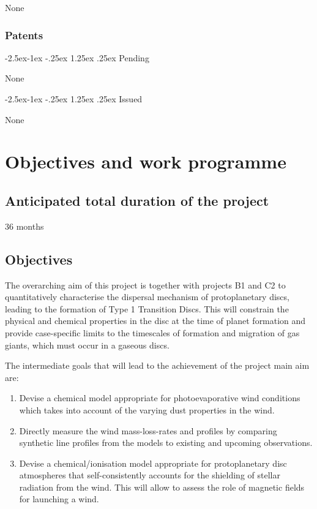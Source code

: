 \documentclass[10pt,fleqn,twoside]{article}
\makeatletter
\newcommand{\Tcol}{\color{blue}}
\renewcommand\paragraph{\@startsection{paragraph}{4}{\z@}%
            {-2.5ex\@plus -1ex \@minus -.25ex}%
            {1.25ex \@plus .25ex}%
            {\normalfont\normalsize\bfseries}}
\makeatother
\begin{document}
None

\subsubsection{\Tcol Patents}

\paragraph{\Tcol Pending}

None 

\paragraph{\Tcol Issued}

None 

\section{\Tcol Objectives and work programme}
\renewcommand{\leftmark}{\sc Objectives and work programme}

\subsection{\Tcol Anticipated total duration of the project}

36 months

\subsection{\Tcol Objectives}

The overarching aim of this project is together with projects B1 and C2 to quantitatively characterise the dispersal mechanism of protoplanetary discs, leading to the formation of Type 1 Transition Discs. This will constrain the physical and chemical properties in the disc at the time of planet formation and provide case-specific limits to the timescales of formation and migration of gas giants, which must occur in a gaseous discs. 

The intermediate goals that will lead to the achievement of the project main aim are: 

\begin{enumerate}

\item Devise a chemical model appropriate for photoevaporative wind conditions which takes into account of the varying dust properties in the wind. 
\item Directly measure the wind mass-loss-rates and profiles by
  comparing synthetic line profiles from the models to existing and upcoming observations.
\item Devise a chemical/ionisation model appropriate for
  protoplanetary disc atmospheres that self-consistently accounts for
  the shielding of stellar radiation from the wind. This will allow to
  assess the role of magnetic fields for launching a wind.
\end{enumerate}
\end{document}
